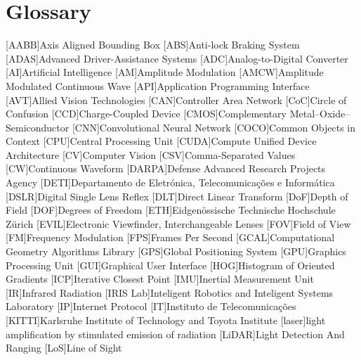 \chapter{Glossary}

\footnotesize
\SingleSpacing

\begin{multicols}{2} 
\begin{acronym}[AAAAAA]
	[AABB]{Axis Aligned Bounding Box}
	[ABS]{Anti-lock Braking System}
	[ADAS]{Advanced Driver-Assistance Systems}
	[ADC]{Analog-to-Digital Converter}
	[AI]{Artificial Intelligence}
	[AM]{Amplitude Modulation}
	[AMCW]{Amplitude Modulated Continuous Wave}
	[API]{Application Programming Interface}
	[AVT]{Allied Vision Technologies}
	[CAN]{Controller Area Network} 
	[CoC]{Circle of Confusion}
	[CCD]{Charge-Coupled Device}
	[CMOS]{Complementary Metal–Oxide–Semiconductor}
	[CNN]{Convolutional Neural Network}
	[COCO]{Common Objects in Context}
	[CPU]{Central Processing Unit}
	[CUDA]{Compute Unified Device Architecture}
	[CV]{Computer Vision}
	[CSV]{Comma-Separated Values}
	[CW]{Continuous Waveform}
	[DARPA]{Defense Advanced Research Projects Agency}
	[DETI]{Departamento de Eletrónica, Telecomunicações e Informática}
	[DSLR]{Digital Single Lens Reflex}
	[DLT]{Direct Linear Transform}
	[DoF]{Depth of Field}
	[DOF]{Degrees of Freedom}
	[ETH]{Eidgenössische Technische Hochschule Zürich}
	[EVIL]{Electronic Viewfinder, Interchangeable Lenses}
	[FOV]{Field of View}
	[FM]{Frequency Modulation}
	[FPS]{Frames Per Second}
	[GCAL]{Computational Geometry Algorithms Library}
	[GPS]{Global Positioning System}
	[GPU]{Graphics Processing Unit}
	[GUI]{Graphical User Interface}
	[HOG]{Histogram of Oriented Gradients}
	[ICP]{Iterative Closest Point}
	[IMU]{Inertial Measurement Unit}
	[IR]{Infrared Radiation}
	[IRIS Lab]{Inteligent Robotics and Inteligent Systems Laboratory}
	[IP]{Internet Protocol}
	[IT]{Instituto de Telecomunicações}
	[KITTI]{Karlsruhe Institute of Technology and Toyota Institute}
	[laser]{light amplification by stimulated emission of radiation}
	[LiDAR]{Light Detection And Ranging}
	[LoS]{Line of Sight}

\end{acronym}
\end{multicols}
